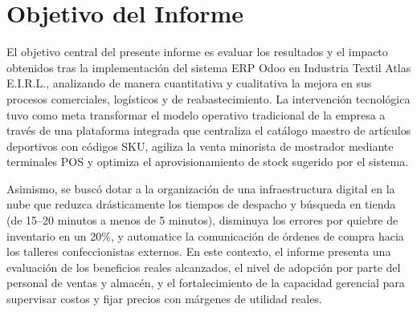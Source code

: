 \section{Objetivo del Informe}

El objetivo central del presente informe es evaluar los resultados y el impacto obtenidos tras la implementación del sistema ERP Odoo en Industria Textil Atlas E.I.R.L., analizando de manera cuantitativa y cualitativa la mejora en sus procesos comerciales, logísticos y de reabastecimiento. La intervención tecnológica tuvo como meta transformar el modelo operativo tradicional de la empresa a través de una plataforma integrada que centraliza el catálogo maestro de artículos deportivos con códigos SKU, agiliza la venta minorista de mostrador mediante terminales POS y optimiza el aprovisionamiento de stock sugerido por el sistema.

Asimismo, se buscó dotar a la organización de una infraestructura digital en la nube que reduzca drásticamente los tiempos de despacho y búsqueda en tienda (de 15--20 minutos a menos de 5 minutos), disminuya los errores por quiebre de inventario en un 20\%, y automatice la comunicación de órdenes de compra hacia los talleres confeccionistas externos. En este contexto, el informe presenta una evaluación de los beneficios reales alcanzados, el nivel de adopción por parte del personal de ventas y almacén, y el fortalecimiento de la capacidad gerencial para supervisar costos y fijar precios con márgenes de utilidad reales.
